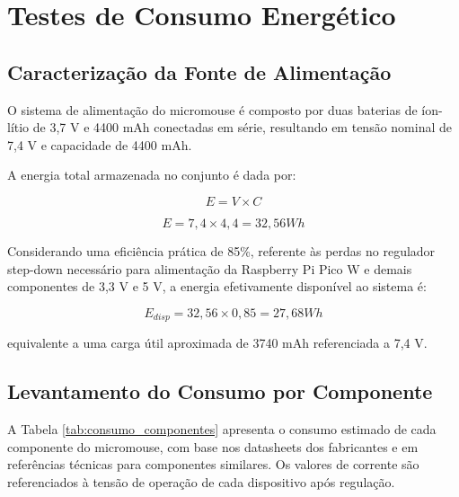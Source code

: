 
\section{Testes de Consumo Energético}

\subsection{Caracterização da Fonte de Alimentação}

O sistema de alimentação do micromouse é composto por duas baterias de íon-lítio de 3,7 V e 4400 mAh conectadas em série, resultando em tensão nominal de 7,4 V e capacidade de 4400 mAh.

A energia total armazenada no conjunto é dada por:

\begin{equation}
E = V \times C
\end{equation}

\begin{equation}
E = 7,4 \times 4,4 = 32,56 { Wh}
\end{equation}

Considerando uma eficiência prática de 85\%, referente às perdas no regulador step-down necessário para alimentação da Raspberry Pi Pico W e demais componentes de 3,3 V e 5 V, a energia efetivamente disponível ao sistema é:

\begin{equation}
E_{disp} = 32,56 \times 0,85 = 27,68 { Wh}
\end{equation}

equivalente a uma carga útil aproximada de 3740 mAh referenciada a 7,4 V.

\subsection{Levantamento do Consumo por Componente}

A Tabela \ref{tab:consumo_componentes} apresenta o consumo estimado de cada componente do micromouse, com base nos datasheets dos fabricantes e em referências técnicas para componentes similares. Os valores de corrente são referenciados à tensão de operação de cada dispositivo após regulação.

